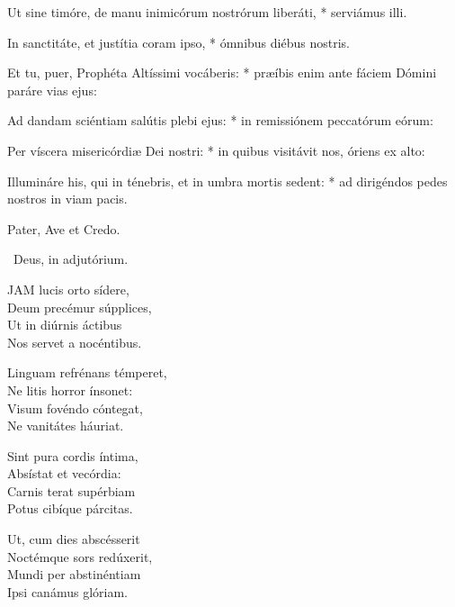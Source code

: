 Ut sine timóre, de manu inimicórum nostrórum liberáti, * serviámus illi.

In sanctitáte, et justítia coram ipso, * ómnibus diébus nostris.

Et tu, puer, Prophéta Altíssimi vocáberis: * præíbis enim ante fáciem Dómini paráre vias ejus:

Ad dandam sciéntiam salútis plebi ejus: * in remissiónem peccatórum eórum:

Per víscera misericórdiæ Dei nostri: * in quibus visitávit nos, óriens ex alto:

Illumináre his, qui in ténebris, et in umbra mortis sedent: * ad dirigéndos pedes nostros in viam pacis.




Pater, Ave et Credo.

\V\ Deus, in adjutórium.


\lettrine[lines=2]{J}{AM} lucis orto sídere,\\
Deum precémur súpplices,\\
Ut in diúrnis áctibus\\
Nos servet a nocéntibus.

Linguam refrénans témperet,\\
Ne litis horror ínsonet:\\
Visum fovéndo cóntegat,\\
Ne vanitátes háuriat.

Sint pura cordis íntima,\\
Absístat et vecórdia:\\
Carnis terat supérbiam\\
Potus cibíque párcitas.

Ut, cum dies abscésserit\\
Noctémque sors redúxerit,\\
Mundi per abstinéntiam\\
Ipsi canámus glóriam.

